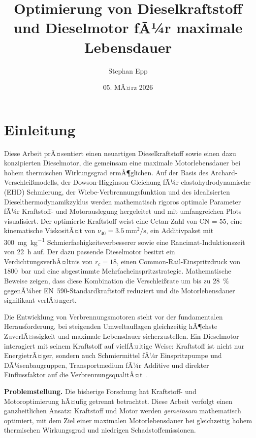 ﻿\documentclass[12pt,a4paper]{article}
\title{\textbf{Optimierung von Dieselkraftstoff und Dieselmotor fÃ¼r maximale Lebensdauer}}
\author{Stephan Epp}
\date{05. MÃ¤rz 2026}
\newcommand{\CN}{\ensuremath{\mathrm{CN}}}
\newcommand{\rc}{\ensuremath{r_c}}
\begin{document}
\maketitle

\tableofcontents
\newpage


\section{Einleitung}
\label{sec:einleitung}
Diese Arbeit prÃ¤sentiert einen neuartigen Dieselkraftstoff sowie einen
dazu konzipierten Dieselmotor, die gemeinsam eine maximale Motorlebensdauer
bei hohem thermischen Wirkungsgrad ermÃ¶glichen. Auf der Basis des
Archard-Verschlei\ss{}modells, der Dowson-Higginson-Gleichung fÃ¼r
elastohydrodynamische (EHD) Schmierung, der Wiebe-Verbrennungsfunktion
und des idealisierten Dieselthermodynamikzyklus werden mathematisch
rigoros optimale Parameter fÃ¼r Kraftstoff- und Motorauslegung hergeleitet
und mit umfangreichen Plots visualisiert. Der optimierte Kraftstoff weist
eine Cetan-Zahl von \CN{} = 55, eine kinematische ViskositÃ¤t von
$\nu_{40} = \SI{3.5}{\mm\squared\per\s}$, ein Additivpaket mit
\SI{300}{\mg\per\kg} Schmierfaehigkeitsverbesserer sowie eine
Rancimat-Induktionszeit von \SI{22}{\hour} auf. Der dazu passende
Dieselmotor besitzt ein VerdichtungsverhÃ¤ltnis von $\rc = 18$, einen
Common-Rail-Einspritzdruck von \SI{1800}{\bar} und eine abgestimmte
Mehrfacheinspritzstrategie. Mathematische Beweise zeigen, dass diese
Kombination die Verschlei\ss{}rate um bis zu \SI{28}{\percent} gegenÃ¼ber
EN~590-Standardkraftstoff reduziert und die Motorlebensdauer signifikant
verlÃ¤ngert.

Die Entwicklung von Verbrennungsmotoren steht vor der fundamentalen
Herausforderung, bei steigenden Umweltauflagen gleichzeitig hÃ¶chste
ZuverlÃ¤ssigkeit und maximale Lebens\-dauer sicherzustellen. Ein Dieselmotor
interagiert mit seinem Kraftstoff auf vielfÃ¤ltige Weise: Kraftstoff ist
nicht nur EnergietrÃ¤ger, sondern auch Schmiermittel fÃ¼r Einspritzpumpe
und DÃ¼senbaugruppen, Transportmedium fÃ¼r Additive und direkter Einflussfaktor
auf die VerbrennungsqualitÃ¤t~\cite{heywood1988}.

\textbf{Problemstellung.} Die bisherige Forschung hat Kraftstoff- und
Motoroptimierung hÃ¤ufig getrennt betrachtet. Diese Arbeit verfolgt einen
ganzheitlichen Ansatz: Kraftstoff und Motor werden \emph{gemeinsam}
mathematisch optimiert, mit dem Ziel einer maximalen Motorlebensdauer bei
gleichzeitig hohem thermischen Wirkungsgrad und niedrigen Schadstoffemissionen.
\end{document}
